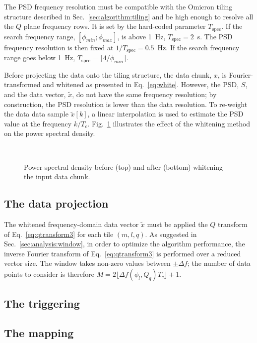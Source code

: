 The PSD frequency resolution must be compatible with the Omicron tiling structure described in Sec.~\ref{sec:algorithm:tiling} and be high enough to resolve all the $Q$ plane frequency rows. It is set by the hard-coded parameter $T_\mathrm{spec}$. If the search frequency range, $[\phi_{min}; \phi_{max}]$, is above 1~Hz, $T_\mathrm{spec}=2$~s. The PSD frequency resolution is then fixed at $1/T_\mathrm{spec}=0.5$~Hz. If the search frequency range goes below 1~Hz, $T_\mathrm{spec}=\lceil4/\phi_{min}\rceil$.

Before projecting the data onto the tiling structure, the data chunk, $x$, is Fourier-transformed and whitened as presented in Eq.~\ref{eq:white}. However, the PSD, $S$, and the data vector, $\tilde{x}$, do not have the same frequency resolution; by construction, the PSD resolution is lower than the data resolution.  To re-weight the data data sample $\tilde{x}[k]$, a linear interpolation is used to estimate the PSD value at the frequency $k/T_c$. Fig.~\ref{fig:white} illustrates the effect of the whitening method on the power spectral density. 
\begin{figure}
  \center
   \\
  \caption{Power spectral density before (top) and after (bottom) whitening the input data chunk.}
  \label{fig:white}
\end{figure}

\subsection{The data projection} \label{sec:algorithm:projection}

The whitened frequency-domain data vector $\tilde{x}$ must be applied the $Q$ transform of Eq.~\ref{eq:qtransform3} for each tile $(m, l, q)$. As suggested in Sec.~\ref{sec:analysis:window}, in order to optimize the algorithm performance, the inverse Fourier transform of Eq.~\ref{eq:qtransform3} is performed over a reduced vector size. The window takes non-zero values between $\pm \Delta f$; the number of data points to consider is therefore $M=2\lfloor \Delta f(\phi_l,Q_q) T_c \rfloor + 1$.


\subsection{The triggering} \label{sec:algorithm:triggering}

\subsection{The mapping} \label{sec:algorithm:mapping}
